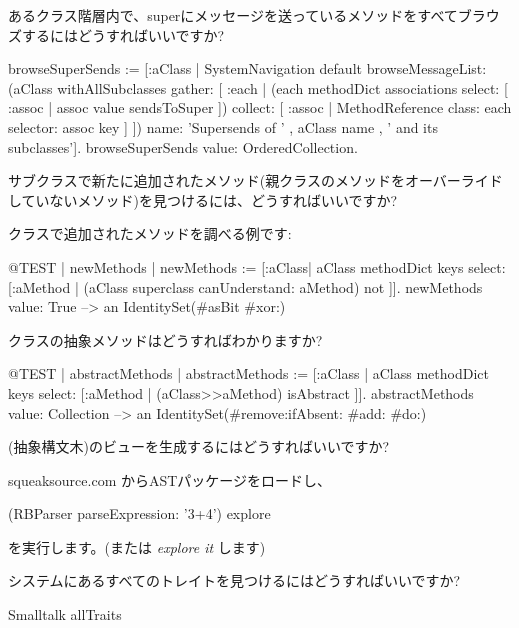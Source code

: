 \documentclass[a4paper,10pt,twoside]{book}
\begin{document}
\begin{faq}
あるクラス階層内で、superにメッセージを送っているメソッドをすべてブラウズするにはどうすればいいですか?
\end{faq}
\answer
\begin{code}{}
browseSuperSends := [:aClass | SystemNavigation default
	browseMessageList: (aClass withAllSubclasses gather: [ :each |
		(each methodDict associations
			select: [ :assoc | assoc value sendsToSuper ])
				collect: [ :assoc | MethodReference class: each selector: assoc key ] ])
	name: 'Supersends of ' , aClass name , ' and its subclasses'].
browseSuperSends value: OrderedCollection.
\end{code}

\begin{faq}
サブクラスで新たに追加されたメソッド(親クラスのメソッドをオーバーライドしていないメソッド)を見つけるには、どうすればいいですか?
\end{faq}
\answer
{}クラスで追加されたメソッドを調べる例です:
\begin{code}{@TEST | newMethods |}
newMethods := [:aClass| aClass methodDict keys select:
	[:aMethod | (aClass superclass canUnderstand: aMethod) not ]].
newMethods value: True --> an IdentitySet(#asBit #xor:)
\end{code}

\begin{faq}
クラスの抽象メソッドはどうすればわかりますか?
\end{faq}
\answer
\begin{code}{@TEST | abstractMethods |}
abstractMethods :=
	[:aClass | aClass methodDict keys select:
		[:aMethod | (aClass>>aMethod) isAbstract ]].
abstractMethods value: Collection --> an IdentitySet(#remove:ifAbsent: #add: #do:)
\end{code}

\begin{faq}
(抽象構文木)のビューを生成するにはどうすればいいですか?
\end{faq}
\answer
squeaksource.com からASTパッケージをロードし、
\begin{code}{}
(RBParser parseExpression: '3+4') explore
\end{code}
を実行します。(または \emph{explore it} します)

\begin{faq}
システムにあるすべてのトレイトを見つけるにはどうすればいいですか?
\end{faq}
\answer
\begin{code}{}
Smalltalk allTraits
\end{code}
\end{document}
